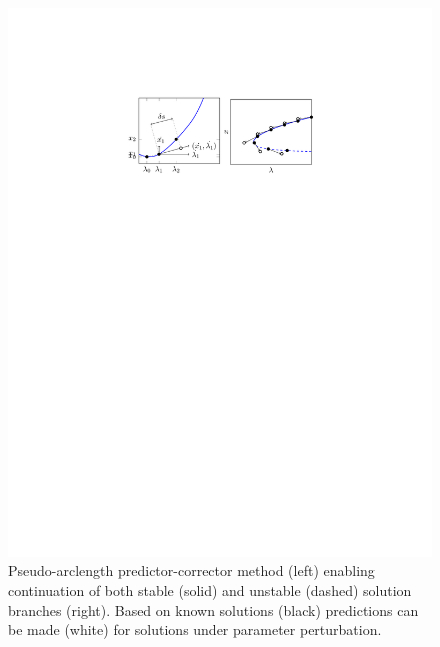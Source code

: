 \documentclass[11pt]{article}
\begin{document}
	\begin{figure}[h]
		\centering
		\includegraphics[width=0.9\linewidth, trim=6cm 19.5cm 6cm 4.5cm, clip=true]{PredictorCorrector}
		\caption{Pseudo-arclength predictor-corrector method (left) enabling continuation of both stable (solid) and unstable (dashed) solution branches (right). Based on known solutions (black) predictions can be made (white) for solutions under parameter perturbation. \label{fig:NC}}
	\end{figure}
\end{document}
